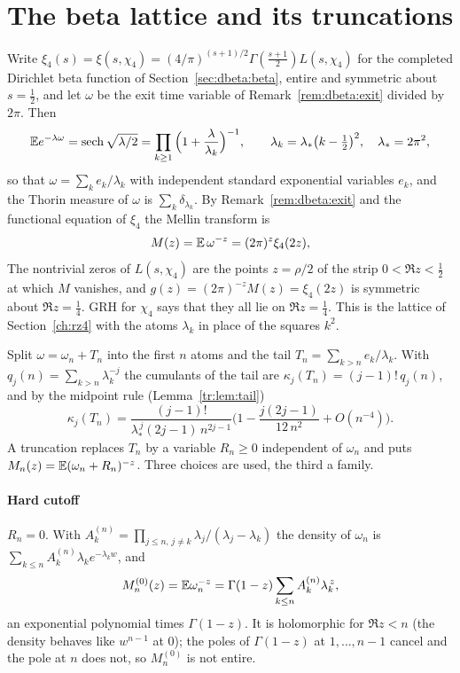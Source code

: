 \section{The beta lattice and its truncations}\label{tr:sec:lattice}

Write $\xi_4(s)=\xi(s,\chi_4)=(4/\pi)^{(s+1)/2}\Gamma(\tfrac{s+1}2)L(s,\chi_4)$ for the completed Dirichlet beta function of Section~\ref{sec:dbeta:beta}, entire and symmetric about $s=\tfrac12$, and let $\omega$ be the exit time variable of Remark~\ref{rem:dbeta:exit} divided by $2\pi$. Then
\[
\mathbb{E} e^{-\lambda\omega}=\operatorname{sech}\sqrt{\lambda/2}=\prod_{k\ge1}\Big(1+\frac\lambda{\lambda_k}\Big)^{-1},\qquad\lambda_k=\lambda_*\big(k-\tfrac12\big)^2,\quad\lambda_*=2\pi^2,
\]
so that $\omega=\sum_ke_k/\lambda_k$ with independent standard exponential variables $e_k$, and the Thorin measure of $\omega$ is $\sum_k\delta_{\lambda_k}$. By Remark~\ref{rem:dbeta:exit} and the functional equation of $\xi_4$ the Mellin transform is
\begin{equation}\label{tr:eq:M}
M(z)=\mathbb{E}\,\omega^{-z}=(2\pi)^z\xi_4(2z),
\end{equation}
The nontrivial zeros of $L(s,\chi_4)$ are the points $z=\rho/2$ of the strip $0<\Re z<\frac12$ at which $M$ vanishes, and $g(z)=(2\pi)^{-z}M(z)=\xi_4(2z)$ is symmetric about $\Re z=\frac14$. GRH for $\chi_4$ says that they all lie on $\Re z=\frac14$. This is the lattice of Section~\ref{ch:rz4} with the atoms $\lambda_k$ in place of the squares $k^2$.

Split $\omega=\omega_n+T_n$ into the first $n$ atoms and the tail $T_n=\sum_{k>n}e_k/\lambda_k$. With $q_j(n)=\sum_{k>n}\lambda_k^{-j}$ the cumulants of the tail are $\kappa_j(T_n)=(j-1)!\,q_j(n)$, and by the midpoint rule (Lemma~\ref{tr:lem:tail})
\begin{equation}\label{tr:eq:cum}
\kappa_j(T_n)=\frac{(j-1)!}{\lambda_*^{\,j}(2j-1)\,n^{2j-1}}\Big(1-\frac{j(2j-1)}{12\,n^2}+O(n^{-4})\Big).
\end{equation}
A truncation replaces $T_n$ by a variable $R_n\ge0$ independent of $\omega_n$ and puts $M_n(z)=\mathbb{E}(\omega_n+R_n)^{-z}$. Three choices are used, the third a family.

\paragraph{Hard cutoff} $R_n=0$. With $A_k^{(n)}=\prod_{j\le n,\,j\ne k}\lambda_j/(\lambda_j-\lambda_k)$ the density of $\omega_n$ is $\sum_{k\le n}A_k^{(n)}\lambda_ke^{-\lambda_kw}$, and
\[
M_n^{(0)}(z)=\mathbb{E}\omega_n^{-z}=\Gamma(1-z)\sum_{k\le n}A_k^{(n)}\lambda_k^{\,z},
\]
an exponential polynomial times $\Gamma(1-z)$. It is holomorphic for $\Re z<n$ (the density behaves like $w^{n-1}$ at $0$); the poles of $\Gamma(1-z)$ at $1,\dots,n-1$ cancel and the pole at $n$ does not, so $M_n^{(0)}$ is not entire.

